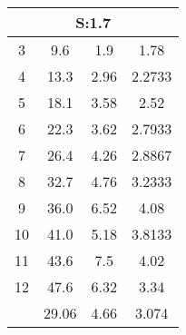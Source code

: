 
	\begin{table}[H]
		\begin{tabular}{c|ccc}
			\multicolumn{4}{c}{S:1.7}\\\hline
			3 & 9.6 & 1.9 & 1.78\\
			4 & 13.3 & 2.96 & 2.2733\\
			5 & 18.1 & 3.58 & 2.52\\
			6 & 22.3 & 3.62 & 2.7933\\
			7 & 26.4 & 4.26 & 2.8867\\
			8 & 32.7 & 4.76 & 3.2333\\
			9 & 36.0 & 6.52 & 4.08\\
			10 & 41.0 & 5.18 & 3.8133\\
			11 & 43.6 & 7.5 & 4.02\\
			12 & 47.6 & 6.32 & 3.34\\
			\hline
			& 29.06 & 4.66 & 3.074\\
		\end{tabular}
	\end{table}
